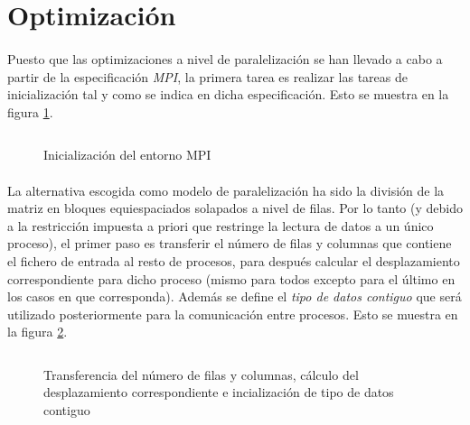 \documentclass[10pt, a4paper,spanish]{article}
\begin{document}
		\paragraph{}
		\cite{subject:cp}

	\section{Optimización}

		\paragraph{}
		Puesto que las optimizaciones a nivel de paralelización se han llevado a cabo a partir de la especificación \emph{MPI}, la primera tarea es realizar las tareas de inicialización tal y como se indica en dicha especificación. Esto se muestra en la figura \ref{code:init}.

		\begin{figure}[h]
			\centering
			\inputminted{c}{./code/init.c}
			\caption{Inicialización del entorno MPI}
			\label{code:init}
		\end{figure}

		\paragraph{}
		La alternativa escogida como modelo de paralelización ha sido la división de la matriz en bloques equiespaciados solapados a nivel de filas. Por lo tanto (y debido a la restricción impuesta a priori que restringe la lectura de datos a un único proceso), el primer paso es transferir el número de filas y columnas que contiene el fichero de entrada al resto de procesos, para después calcular el desplazamiento correspondiente para dicho proceso (mismo para todos excepto para el último en los casos en que corresponda). Además se define el \emph{tipo de datos contiguo} que será utilizado posteriormente para la comunicación entre procesos. Esto se muestra en la figura \ref{code:op1}.

		\begin{figure}[h]
			\centering
			\inputminted{c}{./code/op1.c}
			\caption{Transferencia del número de filas y columnas, cálculo del desplazamiento correspondiente e incialización de tipo de datos contiguo}
			\label{code:op1}
		\end{figure}
\end{document}
